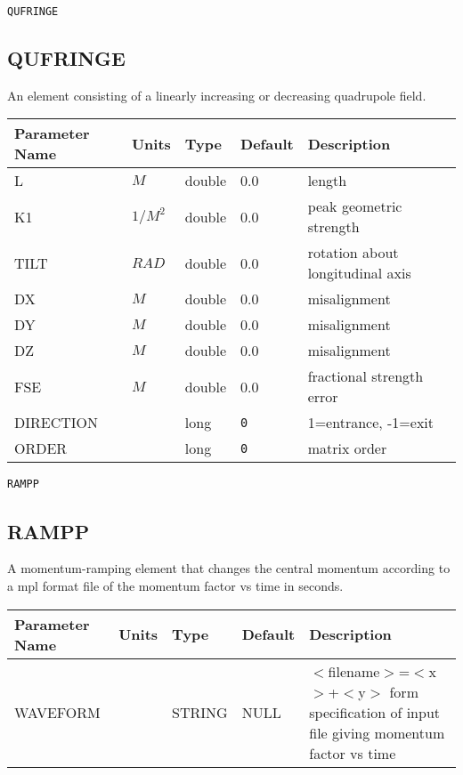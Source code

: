 \begin{latexonly}
\newpage
\begin{center}{\Large\verb|QUFRINGE|}\end{center}
\end{latexonly}\subsection{QUFRINGE}
An element consisting of a linearly increasing or decreasing quadrupole field.
\\
\begin{tabular}{|l|l|l|l|p{\descwidth}|} \hline
Parameter Name & Units & Type & Default & Description \\ \hline 
L & $M$ & double &  0.0 & length  \\ \hline 
K1 & $1/M^{2}$ & double &  0.0 & peak geometric strength  \\ \hline 
TILT & $RAD$ & double &  0.0 & rotation about longitudinal axis  \\ \hline 
DX & $M$ & double &  0.0 & misalignment  \\ \hline 
DY & $M$ & double &  0.0 & misalignment  \\ \hline 
DZ & $M$ & double &  0.0 & misalignment  \\ \hline 
FSE & $M$ & double &  0.0 & fractional strength error  \\ \hline 
DIRECTION &  & long &  \verb|0| & 1=entrance, -1=exit  \\ \hline 
ORDER &  & long &  \verb|0| & matrix order  \\ \hline 
\end{tabular}

\begin{latexonly}
\newpage
\begin{center}{\Large\verb|RAMPP|}\end{center}
\end{latexonly}\subsection{RAMPP}
A momentum-ramping element that changes the central momentum according to a mpl
format file of the momentum factor vs time in seconds.
\\
\begin{tabular}{|l|l|l|l|p{\descwidth}|} \hline
Parameter Name & Units & Type & Default & Description \\ \hline 
WAVEFORM &  & STRING &   NULL            & $<$filename$>$=$<$x$>$+$<$y$>$ form specification of input file giving momentum factor vs time  \\ \hline 
\end{tabular}

